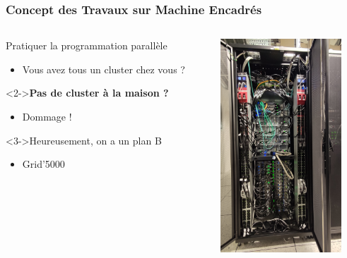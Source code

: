 \documentclass[10pt]{beamer}
\begin{document}
\begin{frame}[label=tme]
  \frametitle{Concept des Travaux sur Machine Encadrés}

  \begin{columns}
    \begin{column}{7cm}

      \begin{block}{Pratiquer la programmation parallèle}
        \begin{itemize}
        \item Vous avez tous un cluster chez vous ?
        \end{itemize}
      \end{block}

      \medskip

      \begin{alertblock}<2->{\textbf{Pas de cluster à la maison ?}}
        \begin{itemize}
        \item Dommage !
        \end{itemize}
      \end{alertblock}
      
      \medskip

      \begin{exampleblock}<3->{Heureusement, on a un plan B}
        \begin{itemize}
        \item Grid'5000
        \end{itemize}
      \end{exampleblock}
      
    \end{column}
    \begin{column}{4cm}
    \includegraphics[height=8cm]{cluster.jpg}
  \end{column}
\end{columns}
\end{frame}
\end{document}
